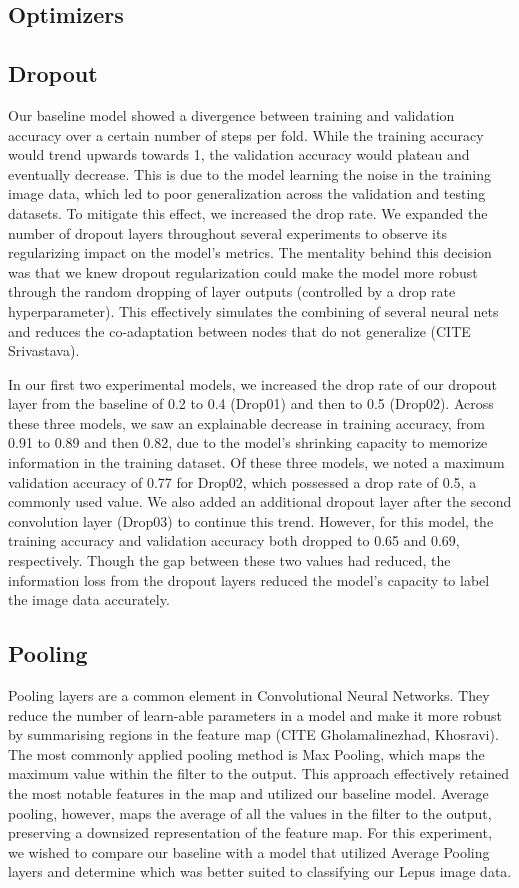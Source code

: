 \documentclass{article}
\begin{document}
\subsection{Optimizers}
\subsection{Dropout}

Our baseline model showed a divergence between training and validation accuracy over a certain number of steps per fold. While the training accuracy would trend upwards towards 1, the validation accuracy would plateau and eventually decrease. This is due to the model learning the noise in the training image data, which led to poor generalization across the validation and testing datasets. To mitigate this effect, we increased the drop rate. We expanded the number of dropout layers throughout several experiments to observe its regularizing impact on the model’s metrics. The mentality behind this decision was that we knew dropout regularization could make the model more robust through the random dropping of layer outputs (controlled by a drop rate hyperparameter). This effectively simulates the combining of several neural nets and reduces the co-adaptation between nodes that do not generalize (CITE Srivastava). 

In our first two experimental models, we increased the drop rate of our dropout layer from the baseline of 0.2 to 0.4 (Drop01) and then to 0.5 (Drop02). Across these three models, we saw an explainable decrease in training accuracy, from 0.91 to 0.89 and then 0.82, due to the model’s shrinking capacity to memorize information in the training dataset. Of these three models, we noted a maximum validation accuracy of 0.77 for Drop02, which possessed a drop rate of 0.5, a commonly used value. We also added an additional dropout layer after the second convolution layer (Drop03) to continue this trend. However, for this model, the training accuracy and validation accuracy both dropped to 0.65 and 0.69, respectively. Though the gap between these two values had reduced, the information loss from the dropout layers reduced the model’s capacity to label the image data accurately.


\subsection{Pooling}

Pooling layers are a common element in Convolutional Neural Networks. They reduce the number of learn-able parameters in a model and make it more robust by summarising regions in the feature map (CITE Gholamalinezhad, Khosravi). The most commonly applied pooling method is Max Pooling, which maps the maximum value within the filter to the output. This approach effectively retained the most notable features in the map and utilized our baseline model. Average pooling, however, maps the average of all the values in the filter to the output, preserving a downsized representation of the feature map. For this experiment, we wished to compare our baseline with a model that utilized Average Pooling layers and determine which was better suited to classifying our Lepus image data.
\end{document}
